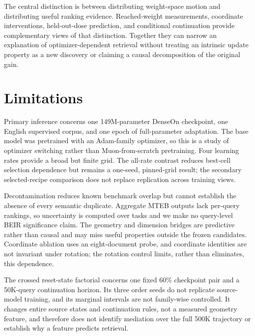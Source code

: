 \documentclass[11pt]{article}
\begin{document}
\CorrectedConclusionFinding

\DimensionConclusionFinding

\StateOperatorConclusionFinding

The central distinction is between distributing weight-space motion and distributing useful ranking
evidence. Reached-weight measurements, coordinate interventions, held-out-dose prediction, and
conditional continuation provide complementary views of that distinction. Together they can narrow
an explanation of optimizer-dependent retrieval without treating an intrinsic update property as a
new discovery or claiming a causal decomposition of the original gain.

\label{paper-main-end}

\section{Limitations}

Primary inference concerns one 149M-parameter DenseOn checkpoint, one English supervised corpus,
and one epoch of full-parameter adaptation. The base model was pretrained with an Adam-family
optimizer, so this is a study of optimizer switching rather than Muon-from-scratch pretraining.
Four learning rates provide a broad but finite grid. The all-rate contrast reduces best-cell
selection dependence but remains a one-seed, pinned-grid result; the secondary selected-recipe
comparison does not replace replication across training views.

Decontamination reduces known benchmark overlap but cannot establish the absence of every semantic
duplicate. Aggregate MTEB outputs lack per-query rankings, so uncertainty is computed over tasks and
we make no query-level BEIR significance claim. The geometry and dimension bridges are predictive
rather than causal and may miss useful properties outside the frozen candidates. Coordinate
ablation uses an eight-document probe, and coordinate identities are not invariant under rotation;
the rotation control limits, rather than eliminates, this dependence.

The crossed reset-state factorial concerns one fixed 60\% checkpoint pair and a 50K-query
continuation horizon. Its three order seeds do not replicate source-model training, and its marginal
intervals are not family-wise controlled. It changes entire source states and continuation rules,
not a measured geometry feature, and therefore does not identify mediation over the full 500K
trajectory or establish why a feature predicts retrieval.
\end{document}
